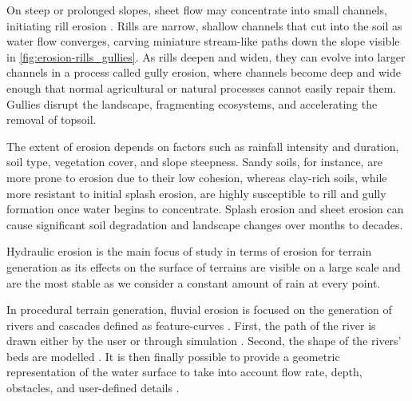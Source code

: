 
On steep or prolonged slopes, sheet flow may concentrate into small channels, initiating rill erosion \cite{Gatto2000}. Rills are narrow, shallow channels that cut into the soil as water flow converges, carving miniature stream-like paths down the slope visible in \cref{fig:erosion-rills_gullies}. As rills deepen and widen, they can evolve into larger channels in a process called gully erosion, where channels become deep and wide enough that normal agricultural or natural processes cannot easily repair them. Gullies disrupt the landscape, fragmenting ecosystems, and accelerating the removal of topsoil.

The extent of erosion depends on factors such as rainfall intensity and duration, soil type, vegetation cover, and slope steepness. Sandy soils, for instance, are more prone to erosion due to their low cohesion, whereas clay-rich soils, while more resistant to initial splash erosion, are highly susceptible to rill and gully formation once water begins to concentrate. Splash erosion and sheet erosion can cause significant soil degradation and landscape changes over months to decades.

\smallConclusion

Hydraulic erosion is the main focus of study in terms of erosion for terrain generation as its effects on the surface of terrains are visible on a large scale and are the most stable as we consider a constant amount of rain at every point.

In procedural terrain generation, fluvial erosion is focused on the generation of rivers and cascades defined as feature-curves \cite{Emilien2015}. First, the path of the river is drawn either by the user \cite{Hnaidi2010} or through simulation \cite{ParisThesis}. Second, the shape of the rivers' beds are modelled \cite{Genevaux2013}. It is then finally possible to provide a geometric representation of the water surface to take into account flow rate, depth, obstacles, and user-defined details \cite{Peytavie2019}.

